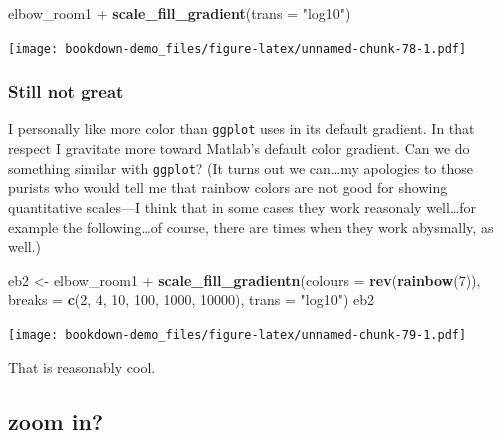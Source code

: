 \documentclass[]{book}
\newenvironment{Shaded}{\begin{snugshade}}{\end{snugshade}}
\newcommand{\KeywordTok}[1]{\textcolor[rgb]{0.13,0.29,0.53}{\textbf{{#1}}}}
\newcommand{\DataTypeTok}[1]{\textcolor[rgb]{0.13,0.29,0.53}{{#1}}}
\newcommand{\DecValTok}[1]{\textcolor[rgb]{0.00,0.00,0.81}{{#1}}}
\newcommand{\StringTok}[1]{\textcolor[rgb]{0.31,0.60,0.02}{{#1}}}
\newcommand{\NormalTok}[1]{{#1}}
\theoremstyle{definition}
\theoremstyle{definition}
\theoremstyle{remark}
\begin{document}
\begin{Shaded}
\begin{Highlighting}[]
\NormalTok{elbow_room1 +}\StringTok{ }\KeywordTok{scale_fill_gradient}\NormalTok{(}\DataTypeTok{trans =} \StringTok{"log10"}\NormalTok{)}
\end{Highlighting}
\end{Shaded}

\texttt{[image: bookdown-demo\_files/figure-latex/unnamed-chunk-78-1.pdf]}

\subsubsection{Still not great}\label{still-not-great}

I personally like more color than \texttt{ggplot} uses in its default
gradient. In that respect I gravitate more toward Matlab's default color
gradient. Can we do something similar with \texttt{ggplot}? (It turns
out we can\ldots{}my apologies to those purists who would tell me that
rainbow colors are not good for showing quantitative scales---I think
that in some cases they work reasonaly well\ldots{}for example the
following\ldots{}of course, there are times when they work abysmally, as
well.)

\begin{Shaded}
\begin{Highlighting}[]
\NormalTok{eb2 <-}\StringTok{ }\NormalTok{elbow_room1 +}\StringTok{ }
\StringTok{    }\KeywordTok{scale_fill_gradientn}\NormalTok{(}\DataTypeTok{colours =} \KeywordTok{rev}\NormalTok{(}\KeywordTok{rainbow}\NormalTok{(}\DecValTok{7}\NormalTok{)),}
                         \DataTypeTok{breaks =} \KeywordTok{c}\NormalTok{(}\DecValTok{2}\NormalTok{, }\DecValTok{4}\NormalTok{, }\DecValTok{10}\NormalTok{, }\DecValTok{100}\NormalTok{, }\DecValTok{1000}\NormalTok{, }\DecValTok{10000}\NormalTok{),}
                         \DataTypeTok{trans =} \StringTok{"log10"}\NormalTok{)}
\NormalTok{eb2}
\end{Highlighting}
\end{Shaded}

\texttt{[image: bookdown-demo\_files/figure-latex/unnamed-chunk-79-1.pdf]}

That is reasonably cool.

\subsection{zoom in?}\label{zoom-in}
\end{document}
